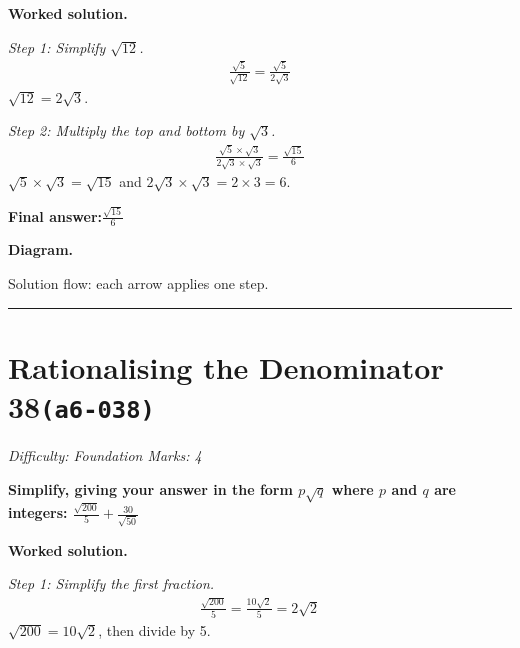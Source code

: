 \documentclass[11pt]{article}
\newcommand{\question}[1]{\par\medskip\noindent\textbf{#1}\par}
\begin{document}
\textbf{Worked solution.}

\textit{Step 1: Simplify \( \sqrt{12} \).}
\[\begin{gathered}
\frac{\sqrt{5}}{\sqrt{12}} = \frac{\sqrt{5}}{2\sqrt{3}}
\end{gathered}\]
\( \sqrt{12} = 2\sqrt{3} \).

\textit{Step 2: Multiply the top and bottom by \( \sqrt{3} \).}
\[\begin{gathered}
\frac{\sqrt{5} \times \sqrt{3}}{2\sqrt{3} \times \sqrt{3}} = \frac{\sqrt{15}}{6}
\end{gathered}\]
\( \sqrt{5} \times \sqrt{3} = \sqrt{15} \) and \( 2\sqrt{3} \times \sqrt{3} = 2 \times 3 = 6 \).

\begin{answerbox}
\textbf{Final answer:}\quad \(\displaystyle \frac{\sqrt{15}}{6}\)
\end{answerbox}
\textbf{Diagram.}

\begin{center}
\end{center}
\small Solution flow: each arrow applies one step.\normalsize

\medskip\hrule

\section*{Rationalising the Denominator 38\quad\small\texttt{(a6-038)}}
\textit{Difficulty: Foundation \quad\textbar\quad Marks: 4}

\question{Simplify, giving your answer in the form \( p\sqrt{q} \) where \( p \) and \( q \) are integers: \( \frac{\sqrt{200}}{5} + \frac{30}{\sqrt{50}} \)}

\textbf{Worked solution.}

\textit{Step 1: Simplify the first fraction.}
\[\begin{gathered}
\frac{\sqrt{200}}{5} = \frac{10\sqrt{2}}{5} = 2\sqrt{2}
\end{gathered}\]
\( \sqrt{200} = 10\sqrt{2} \), then divide by 5.
\end{document}
